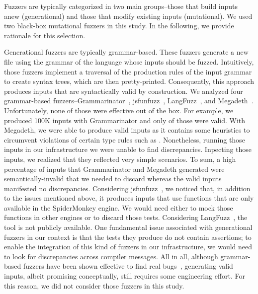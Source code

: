 \documentclass[10pt,conference,anonymous]{IEEEtran}
\begin{document}
Fuzzers are typically categorized in two main groups--those that build
inputs anew (generational) and those that modify existing inputs
(mutational). We used two black-box mutational
fuzzers
in this study. In the following, we provide rationale for this
selection.

Generational fuzzers are typically grammar-based. These fuzzers
generate a new file using the grammar of the language whose inputs
should be fuzzed. Intuitively, those fuzzers implement a traversal of
the production rules of the input grammar to create syntax trees,
which are then pretty-printed. Consequently, this approach produces
inputs that are syntactically valid by construction. We analyzed four
grammar-based fuzzers--Grammarinator~\cite{grammarinator},
jsfunfuzz~\cite{jsfunfuzz},
LangFuzz~\cite{Holler:2012:FCF:2362793.2362831}, and
Megadeth~\cite{grieco2016quickfuzz}.  Unfortunately, none of those
were effective out of the box. For example, we produced 100K inputs
with Grammarinator and only  of those were valid. With
Megadeth, we were able to produce   valid inputs as it
contains some heuristics to circumvent violations of certain type
rules such as . Nonetheless,
running those inputs in our infrastructure we were unable to find
discrepancies. Inpecting those inputs, we realized that they reflected
very simple scenarios. To sum, a high percentage of inputs that
Grammarinator and Megadeth generated were semantically-invalid that we
needed to discard whereas the valid inputs manifested no
discrepancies. Considering jsfunfuzz~\cite{jsfunfuzz}, we noticed
that, in addition to the issues mentioned above, it produces inputs
that use functions that are only available in the SpiderMonkey
engine. We would need either to mock those functions in other engines
or to discard those tests. Considering
LangFuzz~\cite{Holler:2012:FCF:2362793.2362831}, the tool is not
publicly available. One fundamental issue associated with generational
fuzzers in our context is that the tests they produce do not contain
assertions; to enable the integration of this kind of fuzzers in our
infrastructure, we would need to look for discrepancies across
compiler messages.  All in all, although grammar-based fuzzers have
been shown effective to find real
bugs~\cite{Holler:2012:FCF:2362793.2362831}, generating valid inputs,
albeit promising conceptually, still requires some engineering
effort. For this reason, we did not consider those fuzzers in this
study.
\end{document}

